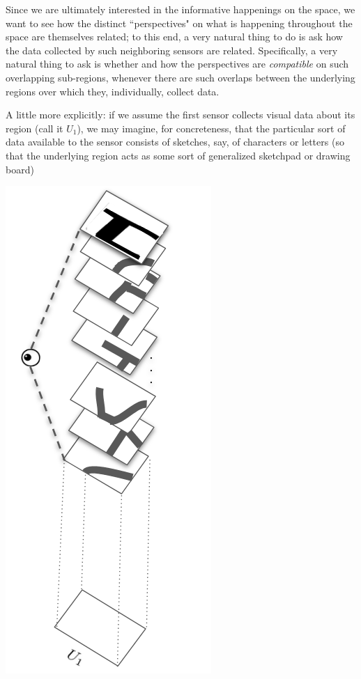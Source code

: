 \documentclass[11pt]{book}
\theoremstyle{definition}
\theoremstyle{definition}
\theoremstyle{definition}
\theoremstyle{theorem}
\theoremstyle{definition}
\begin{document}
	Since we are ultimately interested in the informative happenings on the space, we want to see how the distinct ``perspectives" on what is happening throughout the space are themselves related; to this end, a very natural thing to do is ask how the data collected by such neighboring sensors are related. Specifically, a very natural thing to ask is whether and how the perspectives are \textit{compatible} on such overlapping sub-regions, whenever there are such overlaps between the underlying regions over which they, individually, collect data. \par 
	A little more explicitly: if we assume the first sensor collects visual data about its region (call it $U_1$), we may imagine, for concreteness, that the particular sort of data available to the sensor consists of sketches, say, of characters or letters (so that the underlying region acts as some sort of generalized sketchpad or drawing board)   
	\begin{center}
		\includegraphics[scale=0.25]{EyeballBest.png}
	\end{center}
\end{document}
